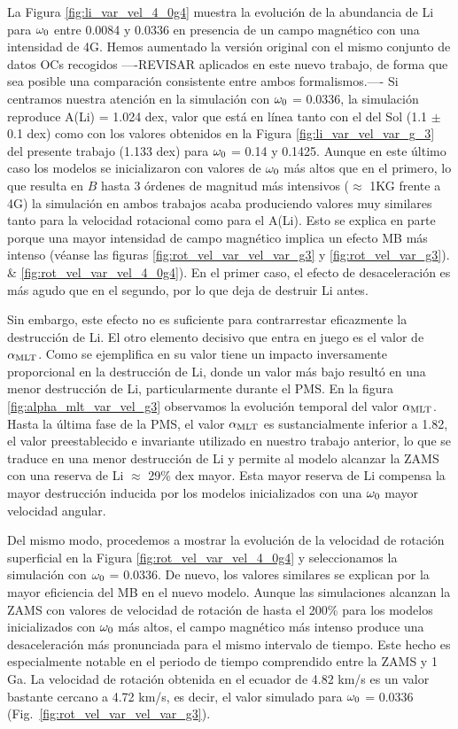 La Figura \ref{fig:li_var_vel_4_0g4} muestra la evolución de la abundancia de Li para $\omega_{\mathrm{0}}$ entre 0.0084 y 0.0336 en presencia de un campo magnético con una intensidad de 4G. Hemos aumentado la versión original con el mismo conjunto de datos OCs recogidos ----REVISAR aplicados en este nuevo trabajo, de forma que sea posible una comparación consistente entre ambos formalismos.---- Si centramos nuestra atención en la simulación con $\omega_{\mathrm{0}}$ = 0.0336, la simulación reproduce A(Li) = 1.024 dex, valor que está en línea tanto con el del Sol (1.1 $\pm$ 0.1 dex) como con los valores obtenidos en la Figura \ref{fig:li_var_vel_var_g_3} del presente trabajo (1.133 dex) para $\omega_{\mathrm{0}}$ = 0.14 y 0.1425. Aunque en este último caso los modelos se inicializaron con valores de $\omega_{\mathrm{0}}$ más altos que en el primero, lo que resulta en $B$ hasta 3 órdenes de magnitud más intensivos ($\approx$ 1KG frente a 4G) la simulación en ambos trabajos acaba produciendo valores muy similares tanto para la velocidad rotacional como para el A(Li). Esto se explica en parte porque una mayor intensidad de campo magnético implica un efecto MB más intenso (véanse las figuras \ref{fig:rot_vel_var_vel_var_g3} y \ref{fig:rot_vel_var_g3}). \& \ref{fig:rot_vel_var_vel_4_0g4}). En el primer caso, el efecto de desaceleración es más agudo que en el segundo, por lo que deja de destruir Li antes.\par

Sin embargo, este efecto no es suficiente para contrarrestar eficazmente la destrucción de Li. El otro elemento decisivo que entra en juego es el valor de $\alpha_{\mathrm{MLT}}$. Como se ejemplifica en \cite{Caballero2020} su valor tiene un impacto inversamente proporcional en la destrucción de Li, donde un valor más bajo resultó en una menor destrucción de Li, particularmente durante el PMS. En la figura \ref{fig:alpha_mlt_var_vel_g3} observamos la evolución temporal del valor $\alpha_{\mathrm{MLT}}$. Hasta la última fase de la PMS, el valor $\alpha_{\mathrm{MLT}}$ es sustancialmente inferior a 1.82, el valor preestablecido e invariante utilizado en nuestro trabajo anterior, lo que se traduce en una menor destrucción de Li y permite al modelo alcanzar la ZAMS con una reserva de Li $\approx$ 29\% dex mayor. Esta mayor reserva de Li compensa la mayor destrucción inducida por los modelos inicializados con una $\omega_{\mathrm{0}}$ mayor velocidad angular.\par

Del mismo modo, procedemos a mostrar la evolución de la velocidad de rotación superficial en la Figura \ref{fig:rot_vel_var_vel_4_0g4} y seleccionamos la simulación con $\omega_{\mathrm{0}}$ = 0.0336. De nuevo, los valores similares se explican por la mayor eficiencia del MB en el nuevo modelo. Aunque las simulaciones alcanzan la ZAMS con valores de velocidad de rotación de hasta el 200\% para los modelos inicializados con $\omega_{\mathrm{0}}$ más altos, el campo magnético más intenso produce una desaceleración más pronunciada para el mismo intervalo de tiempo. Este hecho es especialmente notable en el periodo de tiempo comprendido entre la ZAMS y 1 Ga. La velocidad de rotación obtenida en el ecuador de 4.82 km/s es un valor bastante cercano a 4.72 km/s, es decir, el valor simulado para $\omega_{\mathrm{0}}$ = 0.0336 (Fig.~\ref{fig:rot_vel_var_vel_var_g3}).\par

